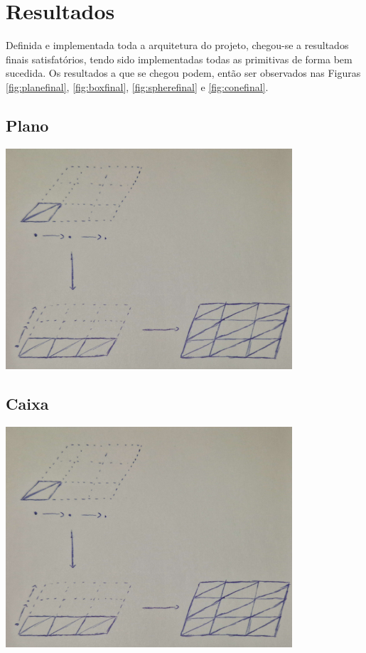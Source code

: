 \section{Resultados}

Definida e implementada toda a arquitetura do projeto, chegou-se a
resultados finais satisfatórios, tendo sido implementadas todas as
primitivas de forma bem sucedida.\newline
\break
\noindent
Os resultados a que se chegou podem, então ser observados nas Figuras
\ref{fig:planefinal}, \ref{fig:boxfinal}, \ref{fig:spherefinal}
e \ref{fig:conefinal}.

\subsection{Plano}

\begin{center}
    \includegraphics[width=0.8\textwidth]{imgs/plane.png}
    \label{fig:planefinal}
\end{center}

\subsection{Caixa}

\begin{center}
    \includegraphics[width=0.8\textwidth]{imgs/plane.png}
    \label{fig:boxfinal}
\end{center}

